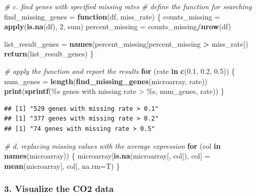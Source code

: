 \documentclass[
]{article}
\newenvironment{Shaded}{\begin{snugshade}}{\end{snugshade}}
\newcommand{\AttributeTok}[1]{\textcolor[rgb]{0.13,0.29,0.53}{#1}}
\newcommand{\CommentTok}[1]{\textcolor[rgb]{0.56,0.35,0.01}{\textit{#1}}}
\newcommand{\ControlFlowTok}[1]{\textcolor[rgb]{0.13,0.29,0.53}{\textbf{#1}}}
\newcommand{\DecValTok}[1]{\textcolor[rgb]{0.00,0.00,0.81}{#1}}
\newcommand{\FloatTok}[1]{\textcolor[rgb]{0.00,0.00,0.81}{#1}}
\newcommand{\FunctionTok}[1]{\textcolor[rgb]{0.13,0.29,0.53}{\textbf{#1}}}
\newcommand{\NormalTok}[1]{#1}
\newcommand{\OtherTok}[1]{\textcolor[rgb]{0.56,0.35,0.01}{#1}}
\newcommand{\SpecialCharTok}[1]{\textcolor[rgb]{0.81,0.36,0.00}{\textbf{#1}}}
\newcommand{\StringTok}[1]{\textcolor[rgb]{0.31,0.60,0.02}{#1}}
\begin{document}
\begin{Shaded}
\begin{Highlighting}[]
\CommentTok{\# c. find genes with specified missing rates}
\CommentTok{\# define the function for searching}
\NormalTok{find\_missing\_genes }\OtherTok{=} \ControlFlowTok{function}\NormalTok{(df, miss\_rate) \{}
\NormalTok{  counts\_missing  }\OtherTok{=} \FunctionTok{apply}\NormalTok{(}\FunctionTok{is.na}\NormalTok{(df), }\DecValTok{2}\NormalTok{, sum)}
\NormalTok{  percent\_missing }\OtherTok{=}\NormalTok{ counts\_missing}\SpecialCharTok{/}\FunctionTok{nrow}\NormalTok{(df)}
  
\NormalTok{  list\_result\_genes }\OtherTok{=} \FunctionTok{names}\NormalTok{(percent\_missing[percent\_missing }\SpecialCharTok{\textgreater{}}\NormalTok{ miss\_rate])}
  \FunctionTok{return}\NormalTok{(list\_result\_genes)}
\NormalTok{\}}

\CommentTok{\# apply the function and report the results}
\ControlFlowTok{for}\NormalTok{ (rate }\ControlFlowTok{in} \FunctionTok{c}\NormalTok{(}\FloatTok{0.1}\NormalTok{, }\FloatTok{0.2}\NormalTok{, }\FloatTok{0.5}\NormalTok{)) \{}
\NormalTok{  num\_genes }\OtherTok{=} \FunctionTok{length}\NormalTok{(}\FunctionTok{find\_missing\_genes}\NormalTok{(microarray, rate))}
  \FunctionTok{print}\NormalTok{(}\FunctionTok{sprintf}\NormalTok{(}\StringTok{\textquotesingle{}\%s genes with missing rate \textgreater{} \%s\textquotesingle{}}\NormalTok{, num\_genes, rate))}
\NormalTok{\}}
\end{Highlighting}
\end{Shaded}

\begin{verbatim}
## [1] "529 genes with missing rate > 0.1"
## [1] "377 genes with missing rate > 0.2"
## [1] "74 genes with missing rate > 0.5"
\end{verbatim}

\begin{Shaded}
\begin{Highlighting}[]
\CommentTok{\# d. replacing missing values with the average expression}
\ControlFlowTok{for}\NormalTok{ (col }\ControlFlowTok{in} \FunctionTok{names}\NormalTok{(microarray)) \{}
\NormalTok{  microarray[}\FunctionTok{is.na}\NormalTok{(microarray[, col]), col] }\OtherTok{=} \FunctionTok{mean}\NormalTok{(microarray[, col], }\AttributeTok{na.rm=}\NormalTok{T)}
\NormalTok{\}}
\end{Highlighting}
\end{Shaded}

\subsubsection{3. Visualize the CO2 data}\label{visualize-the-co2-data}
\end{document}
